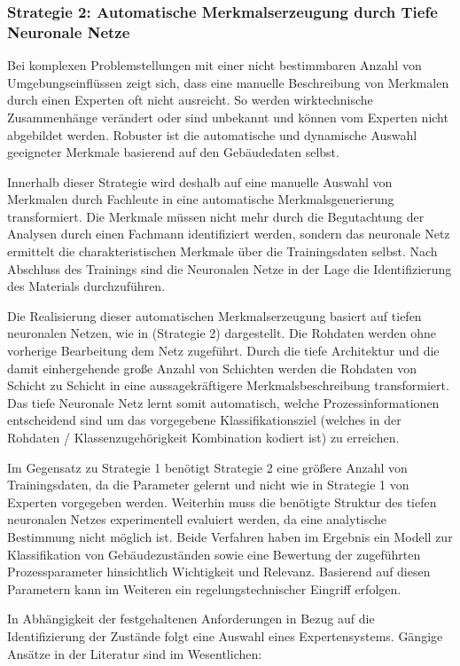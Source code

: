 \subsubsection{Strategie 2: Automatische Merkmalserzeugung durch Tiefe Neuronale Netze}
Bei komplexen Problemstellungen mit einer nicht bestimmbaren Anzahl von Umgebungseinflüssen zeigt sich, dass eine manuelle Beschreibung von Merkmalen durch einen Experten oft nicht ausreicht. So werden wirktechnische Zusammenhänge verändert  oder sind unbekannt und können vom Experten nicht abgebildet werden. Robuster ist die automatische und dynamische Auswahl geeigneter Merkmale basierend auf den Gebäudedaten selbst. 

Innerhalb dieser Strategie wird deshalb auf eine manuelle Auswahl von Merkmalen durch Fachleute in eine automatische Merkmalsgenerierung transformiert. Die Merkmale müssen nicht mehr durch die Begutachtung der Analysen durch einen Fachmann identifiziert werden, sondern das neuronale Netz ermittelt die charakteristischen Merkmale über die Trainingsdaten selbst. Nach Abschluss des Trainings sind die Neuronalen Netze in der Lage die Identifizierung des Materials durchzuführen.  

Die Realisierung dieser automatischen Merkmalserzeugung basiert auf tiefen neuronalen Netzen, wie in  (Strategie 2) dargestellt. Die Rohdaten werden ohne vorherige Bearbeitung dem Netz zugeführt. Durch die tiefe Architektur und die damit einhergehende große Anzahl von Schichten werden die Rohdaten von Schicht zu Schicht in eine aussagekräftigere Merkmalsbeschreibung transformiert. Das tiefe Neuronale Netz lernt somit automatisch, welche Prozessinformationen entscheidend sind um das vorgegebene Klassifikationsziel (welches in der Rohdaten / Klassenzugehörigkeit Kombination kodiert ist) zu erreichen.

Im Gegensatz zu Strategie 1 benötigt Strategie 2 eine größere Anzahl von Trainingsdaten, da die Parameter gelernt und nicht wie in Strategie 1 von Experten vorgegeben werden. Weiterhin muss die benötigte Struktur des tiefen neuronalen Netzes experimentell evaluiert werden, da eine analytische Bestimmung nicht möglich ist. Beide Verfahren haben im Ergebnis ein Modell zur Klassifikation von Gebäudezuständen sowie eine Bewertung der zugeführten Prozessparameter hinsichtlich Wichtigkeit und Relevanz. Basierend auf diesen Parametern kann im Weiteren ein regelungstechnischer Eingriff erfolgen.

In Abhängigkeit der festgehaltenen Anforderungen in Bezug auf die Identifizierung der Zustände folgt eine Auswahl eines Expertensystems. Gängige Ansätze in der Literatur sind im Wesentlichen:

